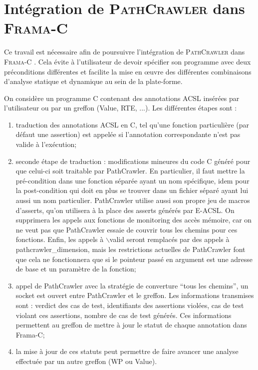 
\chapter{Intégration de \textsc{PathCrawler} dans \textsc{Frama-C}}

Ce travail est nécessaire afin de poursuivre l'intégration de
\textsc{PathCrawler} \cite{PathCrawler} dans \textsc{Frama-C} \cite{Frama-C}.
Cela évite à l'utilisateur de devoir spécifier son programme avec deux
préconditions différentes et facilite la mise en \oe{}uvre des différentes
combinaisons d'analyse statique et dynamique au sein de la plate-forme.


On considère un programme C contenant des annotations ACSL insérées par l'utilisateur ou par un greffon (Value, RTE, ...). Les différentes étapes sont :
\begin{enumerate}
  \item traduction des annotations ACSL en C, tel qu'une fonction particulière
    (par défaut une assertion) est appelée si l'annotation correspondante n'est
    pas valide à l'exécution;
  \item seconde étape de traduction : modifications mineures du code C généré
    pour que celui-ci soit traitable par PathCrawler. En particulier, il faut
    mettre la pré-condition dans une fonction séparée ayant un nom spécifique,
    idem pour la post-condition qui doit en plus se trouver dans un fichier
    séparé ayant lui aussi un nom particulier. PathCrawler utilise aussi son
    propre jeu de macros d'asserts, qu'on utilisera à la place des asserts
    générés par E-ACSL. On supprimera les appels aux fonctions de
    monitoring des accès mémoire, car on ne veut pas que PathCrawler essaie de
    couvrir tous les chemins pour ces fonctions. Enfin, les appels à
    $\backslash$valid seront remplacés par des appels à pathcrawler\_dimension,
    mais les restrictions actuelles de PathCrawler font que cela ne fonctionnera
    que si le pointeur passé en argument est une adresse de base et un paramètre
    de la fonction;
  \item appel de PathCrawler avec la stratégie de converture ``tous les
    chemins'', un socket est ouvert entre PathCrawler et le greffon. Les
    informations transmises sont : verdict des cas de test, identifiants des
    assertions violées, cas de test violant ces assertions, nombre de cas de
    test générés. Ces informations permettent au greffon de mettre à jour le
    statut de chaque annotation dans Frama-C;
  \item la mise à jour de ces statuts peut permettre de faire avancer une
    analyse effectuée par un autre greffon (WP ou Value).
\end{enumerate}~\\


